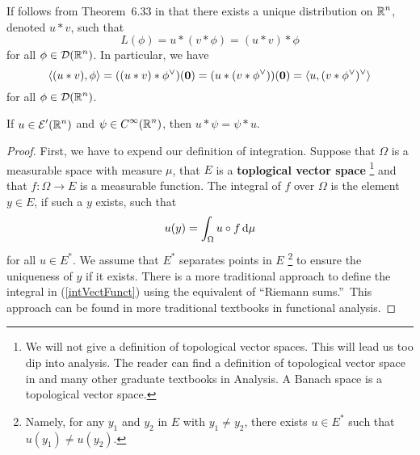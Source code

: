 If follows from Theorem~6.33 in \cite{RuFA} that there exists a unique
distribution on $\displaystyle \mathbb{R}^n$, denoted $u\ast v$, such that
\[
L(\phi) = u \ast ( v \ast \phi) = (u \ast v ) \ast \phi
\]
for all $\displaystyle \phi \in \mathcal{D}(\mathbb{R}^n)$.  In particular, we have
\[
\left\langle{(u \ast v)} , {\phi}\right\rangle = ( (u\ast v) \ast \phi^\vee)(\mathbf{0}) 
= (u \ast (v \ast \phi^\vee))(\mathbf{0}) 
= \left\langle{u} , { (v \ast \phi^\vee)^\vee}\right\rangle
\]
for all $\displaystyle \phi \in \mathcal{D}(\mathbb{R}^n)$.

\begin{prop} \label{uvequvu}
If $\displaystyle u\in \mathcal{E}'(\mathbb{R}^n)$ and
$\displaystyle \psi\in C^\infty(\mathbb{R}^n)$, then
$u \ast \psi = \psi \ast u$.
\end{prop}

\begin{proof}
First, we have to expend our definition of integration.
Suppose that $\Omega$ is a measurable space with measure $\mu$, that $E$
is a {\bfseries toplogical vector space} \footnote{We will not give a definition of topological
vector spaces.  This will lead us too dip into analysis.  The reader
can find a definition of topological vector space in
\cite{ReeSim,RuFA,Tr} and many other graduate textbooks in Analysis.
A Banach space is a topological vector space.}
and that $f:\Omega \to E$ is a measurable
function.  The integral of $f$ over $\Omega$ is the element $y \in E$,
if such a $y$ exists, such that
\begin{equation} \label{intVectFunct}
  u(y) = \int_\Omega u\circ f \,\mathrm{d}{\mu}
\end{equation}
for all $\displaystyle u \in E^\ast$.   We assume that
$\displaystyle E^\ast$ separates points in $E$
\footnote{Namely, for any $y_1$ and $y_2$ in
$E$ with $y_1 \neq y_2$, there exists $\displaystyle u \in E^\ast$
such that $u(y_1) \neq u(y_2)$.} to ensure the uniqueness of $y$ if it
exists.  There is a more traditional approach to define the integral
in (\ref{intVectFunct}) using the equivalent of ``Riemann sums.''\
This approach can be found in more traditional textbooks in functional
analysis.


\end{proof}
